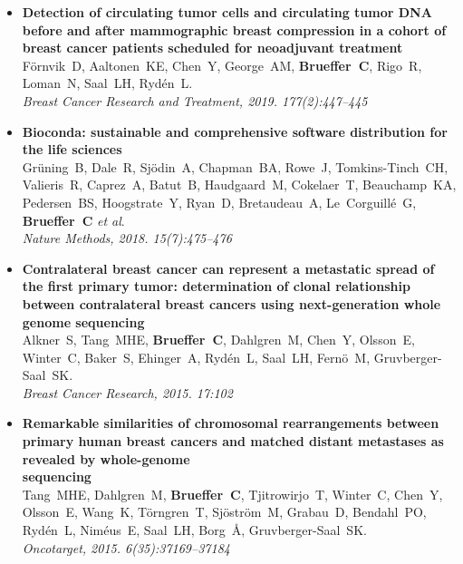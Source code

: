 \documentclass[11pt]{book}
\begin{document}
\begin{itemize}[labelsep=5.3mm]
  \item \textbf{Detection of circulating tumor cells and circulating tumor DNA before and after mammographic breast compression in a cohort of breast cancer patients scheduled for neoadjuvant treatment} \\[1mm]
  Förnvik~D, Aaltonen~KE, Chen~Y, George~AM, \mbox{\textbf{Brueffer~C}}, Rigo~R, Loman~N, Saal~LH, Rydén~L. \\[1mm]
  \textit{Breast Cancer Research and Treatment, 2019. 177(2):447--445}

  \item \textbf{Bioconda: sustainable and comprehensive software distribution for the life sciences} \\[1mm]
  Grüning~B\footnotemark[1], Dale~R\footnotemark[1], Sjödin~A, Chapman~BA, Rowe~J, Tomkins-Tinch~CH, \mbox{Valieris~R}, Caprez~A, Batut~B, Haudgaard~M, Cokelaer~T, Beauchamp~KA, Pedersen~BS, Hoogstrate~Y, Ryan~D, Bretaudeau~A, Le~Corguillé~G, \mbox{\textbf{Brueffer~C}} \textit{et al}. \\[1mm]
  \textit{Nature Methods, 2018. 15(7):475--476}

\end{itemize}


\newpage

\begin{itemize}[labelsep=5.3mm]

  \item \textbf{Contralateral breast cancer can represent a metastatic spread of the first primary tumor: determination of clonal relationship between contralateral breast cancers using next-generation whole genome sequencing} \\[1mm]
  Alkner~S\footnotemark[1], Tang~MHE\footnotemark[1], \mbox{\textbf{Brueffer~C}}, Dahlgren~M, Chen~Y, Olsson~E, Winter~C, Baker~S, Ehinger~A, Rydén~L, Saal~LH, Fernö~M, Gruvberger-Saal~SK. \\[1mm]
  \textit{Breast Cancer Research, 2015. 17:102}
  
  \item \textbf{Remarkable similarities of chromosomal rearrangements between primary human breast cancers and matched distant metastases as revealed by whole-genome \\ sequencing} \\[1mm]
  Tang~MHE\footnotemark[1], Dahlgren~M\footnotemark[1], \mbox{\textbf{Brueffer~C}}, Tjitrowirjo~T, Winter~C, Chen~Y, Olsson~E, Wang~K, Törngren~T, Sjöström~M, Grabau~D, Bendahl~PO, \mbox{Rydén~L}, Niméus~E, Saal~LH, Borg~Å, Gruvberger-Saal~SK. \\[1mm]
  \textit{Oncotarget, 2015. 6(35):37169--37184}

\end{itemize}
\end{document}
